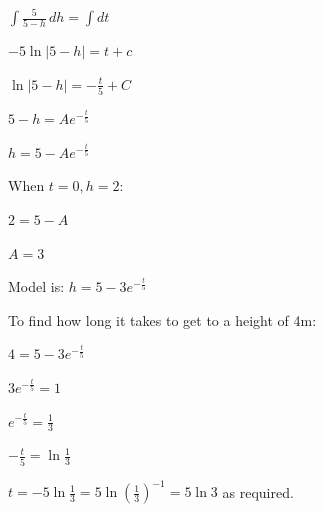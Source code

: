 \documentclass[../main.tex]{subfiles}
\begin{document}
\begin{spacing}{1.5}
\begin{enumerate}[itemsep=0.7cm]
    $\int \frac{5}{5-h}\,dh=\int dt$

    $-5\ln{|5-h|}=t+c$

    $\ln{|5-h|}=-\frac{t}{5}+C$

    $5-h=Ae^{-\frac{t}{5}}$

    $h=5-Ae^{-\frac{t}{5}}$

    When $t=0, h=2$:

    $2=5-A$

    $A=3$

    Model is: $h=5-3e^{-\frac{t}{5}}$

    To find how long it takes to get to a height of 4m:

    $4=5-3e^{-\frac{t}{5}}$

    $3e^{-\frac{t}{5}}=1$

    $e^{-\frac{t}{5}}=\frac{1}{3}$

    $-\frac{t}{5}=\ln{\frac{1}{3}}$

    $t=-5\ln{\frac{1}{3}}=5\ln{(\frac{1}{3})^{-1}}=5\ln{3}$ as required.


\end{enumerate}


\end{spacing}
\end{document}
